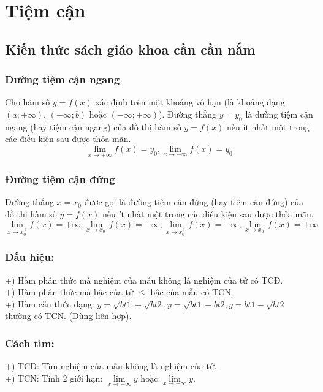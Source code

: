 \setcounter{section}{3}
\section{Tiệm cận}
\subsection{Kiến thức sách giáo khoa cần cần nắm}
\subsubsection{Đường tiệm cận ngang}
Cho hàm số $y=f(x)$ xác định trên một khoảng vô hạn (là khoảng dạng $(a;+\infty)$, $(-\infty;b)$ hoặc $(-\infty;+\infty)$). Đường thẳng $y=y_0$ là đường tiệm cận ngang (hay tiệm cận ngang) của đồ thị hàm số $y=f(x)$ nếu ít nhất một trong các điều kiện sau được thỏa mãn.
 	$$\lim\limits_{x\to+\infty} f(x)=y_0,\lim\limits_{x\to-\infty} f(x)=y_0$$
\subsubsection{Đường tiệm cận đứng}
Đường thẳng $x=x_0$ được gọi là đường tiệm cận đứng (hay tiệm cận đứng) của đồ thị hàm số $y=f(x)$ nếu ít nhất một trong các điều kiện sau được thỏa mãn.
 $$\lim\limits_{x\to x_0^+} f(x)=+\infty,\lim\limits_{x\to x_0^-} f(x)=-\infty,\lim\limits_{x\to x_0^+} f(x)=-\infty,\lim\limits_{x\to x_0^-} f(x)=+\infty$$
\subsubsection{Dấu hiệu:}
+) Hàm phân thức mà nghiệm của mẫu không là nghiệm của tử có TCĐ.\\
+) Hàm phân thức mà bậc của tử $\leq$ bậc của mẫu có TCN.\\
+) Hàm căn thức dạng: $y=\sqrt{bt1}-\sqrt{bt2},y=\sqrt{bt1}-bt2,y=bt1-\sqrt{bt2}$ thường có TCN. (Dùng liên hợp).\\
\subsubsection{Cách tìm:}
+) TCĐ: Tìm nghiệm của mẫu không là nghiệm của tử.\\
+) TCN: Tính 2 giới hạn: $\lim\limits_{x\to+\infty} y$ hoặc $\lim\limits_{x\to-\infty} y$.
